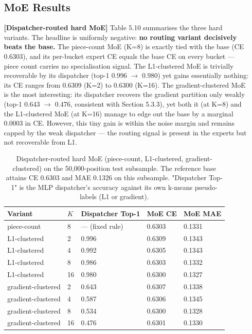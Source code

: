 \subsection{MoE Results}

\textbf{[Dispatcher-routed hard MoE]} Table 5.10 summarises the three hard variants. The headline is uniformly negative: \textbf{no routing variant decisively beats the base.} The piece-count MoE (K=8) is exactly tied with the base (CE 0.6303), and its per-bucket expert CE equals the base CE on every bucket — piece count carries no specialisation signal. The L1-clustered MoE is trivially recoverable by its dispatcher (top-1 0.996 $\to$ 0.980) yet gains essentially nothing: its CE ranges from 0.6309 (K=2) to 0.6300 (K=16). The gradient-clustered MoE is the most interesting: its dispatcher recovers the gradient partition only weakly (top-1 0.643 $\to$ 0.476, consistent with Section 5.3.3), yet both it (at K=8) and the L1-clustered MoE (at K=16) manage to edge out the base by a marginal 0.0003 in CE. However, this tiny gain is within the noise margin and remains capped by the weak dispatcher — the routing signal is present in the experts but not recoverable from L1.

\begin{table}[H]
	\centering
	\small
	\begin{tabular}{lllll}
		\toprule
		Variant & $K$ & Dispatcher Top-1 & MoE CE & MoE MAE \\
		\midrule
		piece-count & 8 & — (fixed rule) & 0.6303 & 0.1331 \\
		L1-clustered & 2 & 0.996 & 0.6309 & 0.1343 \\
		L1-clustered & 4 & 0.992 & 0.6305 & 0.1343 \\
		L1-clustered & 8 & 0.986 & 0.6303 & 0.1332 \\
		L1-clustered & 16 & 0.980 & 0.6300 & 0.1327 \\
		gradient-clustered & 2 & 0.643 & 0.6307 & 0.1338 \\
		gradient-clustered & 4 & 0.587 & 0.6306 & 0.1345 \\
		gradient-clustered & 8 & 0.534 & 0.6300 & 0.1328 \\
		gradient-clustered & 16 & 0.476 & 0.6301 & 0.1330 \\
		\bottomrule
	\end{tabular}

	\caption{Dispatcher-routed hard MoE (piece-count, L1-clustered, gradient-clustered) on the 50,000-position test subsample. The reference base attains CE 0.6303 and MAE 0.1326 on this subsample. "Dispatcher Top-1" is the MLP dispatcher's accuracy against its own k-means pseudo-labels (L1 or gradient).}
	\label{tab:5.10}
\end{table}

